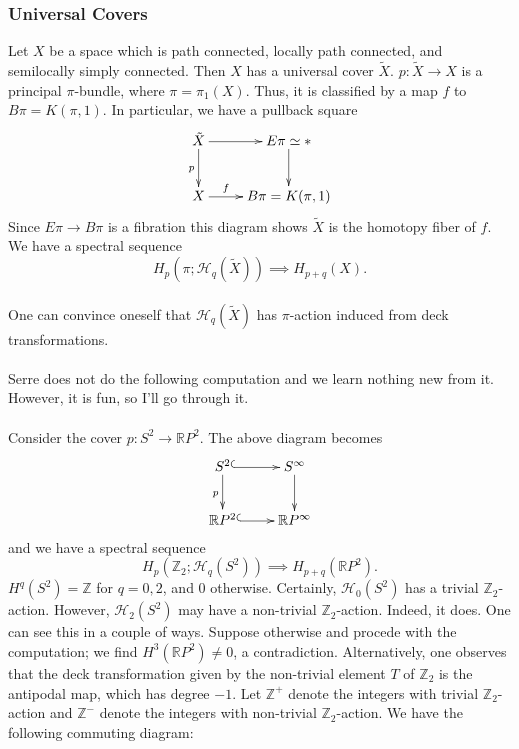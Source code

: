 \documentclass[11pt]{article}
\begin{document}
\begin{Jandr SSS notes}
	\subsubsection{Universal Covers}
Let $X$ be a space which is path connected, locally path connected, and semilocally simply connected. Then $X$ has a universal cover $\tilde{X}$. $p:\tilde{X}\to X$ is a principal $\pi$-bundle, where $\pi=\pi_1(X)$. Thus, it is classified by a map $f$ to $B\pi=K(\pi,1)$. In particular, we have a pullback square
\[\xymatrix{\tilde{X}\ar[r]\ar[d]_p&E\pi\simeq*\ar[d]\\X\ar[r]^-f&B\pi=K(\pi,1)}\]
Since $E\pi\to B\pi$ is a fibration this diagram shows $\tilde{X}$ is the homotopy fiber of $f$. We have a spectral sequence
\[H_p(\pi;\mathscr{H}_q(\tilde{X}))\implies H_{p+q}(X).\]
\\
One can convince oneself that $\mathscr{H}_q(\tilde{X})$ has $\pi$-action induced from deck transformations.\\
\\
Serre does not do the following computation and we learn nothing new from it. However, it is fun, so I'll go through it.\\
\\
Consider the cover $p:S^2\to\mathbb{R}P^2$. The above diagram becomes
\[\xymatrix{S^2\ar@{^{(}->}[r]\ar[d]_p & S^{\infty}\ar[d]\\ \mathbb{R}P^2\ar@{^{(}->}[r] & \mathbb{R}P^{\infty}}\]
and we have a spectral sequence
\[H_p(\mathbb{Z}_2;\mathscr{H}_q(S^2))\implies H_{p+q}(\mathbb{R}P^2).\]
$H^q(S^2)=\mathbb{Z}$ for $q=0,2$, and $0$ otherwise. Certainly, $\mathscr{H}_0(S^2)$ has a trivial $\mathbb{Z}_2$-action. However, $\mathscr{H}_2(S^2)$ may have a non-trivial $\mathbb{Z}_2$-action. Indeed, it does. One can see this in a couple of ways. Suppose otherwise and procede with the computation; we find $H^3(\mathbb{R}P^2)\neq 0$, a contradiction. Alternatively, one observes that the deck transformation given by the non-trivial element $T$ of $\mathbb{Z}_2$ is the antipodal map, which has degree $-1$. Let $\mathbb{Z}^+$ denote the integers with trivial $\mathbb{Z}_2$-action and $\mathbb{Z}^-$ denote the integers with non-trivial $\mathbb{Z}_2$-action. We have the following commuting diagram:%

\end{Jandr SSS notes}
\end{document}
